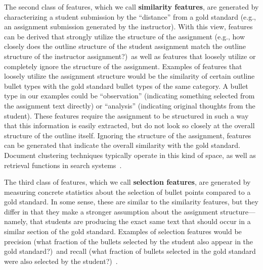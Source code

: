 The second class of features, which we call \textbf{similarity features},
are generated by characterizing a student submission by the ``distance''
from a gold standard (e.g., an assignment submission generated by the
instructor). With this view, features can be derived that strongly utilize
the structure of the assignment (e.g., how closely does the outline
structure of the student assignment match the outline structure of the
instructor assignment?)\ as well as features that loosely utilize or
completely ignore the structure of the assignment. Examples of features
that loosely utilize the assignment structure would be the similarity of
certain outline bullet types with the gold standard bullet types of the
same category. A bullet type in our examples could be ``observation''
(indicating something selected from the assignment text directly) or
``analysis'' (indicating original thoughts from the student). These
features require the assignment to be structured in such a way that this
information is easily extracted, but do not look so closely at the overall
structure of the outline itself. Ignoring the structure of the assignment,
features can be generated that indicate the overall similarity with the
gold standard. Document clustering techniques typically operate in this
kind of space, as well as retrieval functions in search
systems~\cite{Manning:2008}.

The third class of features, which we call \textbf{selection features},
are generated by measuring concrete statistics about the selection of
bullet points compared to a gold standard. In some sense, these are similar
to the similarity features, but they differ in that they make a stronger
assumption about the assignment structure---namely, that students are
producing the exact same text that should occur in a similar section of the
gold standard. Examples of selection features would be precision (what
fraction of the bullets selected by the student also appear in the gold
standard?)\ and recall (what fraction of bullets selected in the gold
standard were also selected by the student?)~\cite{Manning:2008}.

